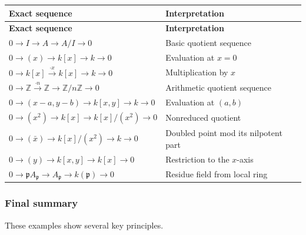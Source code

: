 \documentclass[12pt,a4paper]{article}
\theoremstyle{notespace}
\newcommand{\mf}{\mathfrak}
\theoremstyle{definition}
\begin{document}
\begin{center}
	\renewcommand{\arraystretch}{1.35}
	\begin{longtable}{>{\raggedright\arraybackslash}p{}
			>{\raggedright\arraybackslash}p{}}
		\toprule
		\textbf{Exact sequence} & \textbf{Interpretation} \\
		\midrule
		\endfirsthead
		
		\toprule
		\textbf{Exact sequence} & \textbf{Interpretation} \\
		\midrule
		\endhead
		
		\bottomrule
		\endfoot
		
		\(
		0\to I\to A\to A/I\to 0
		\)
		&
		Basic quotient sequence
		\\
		
		\(
		0\to (x)\to k[x]\to k\to 0
		\)
		&
		Evaluation at \(x=0\)
		\\
		
		\(
		0\to k[x]\xrightarrow{\cdot x}k[x]\to k\to 0
		\)
		&
		Multiplication by \(x\)
		\\
		
		\(
		0\to \mathbb Z\xrightarrow{\cdot n}\mathbb Z\to \mathbb Z/n\mathbb Z\to 0
		\)
		&
		Arithmetic quotient sequence
		\\
		
		\(
		0\to (x-a,y-b)\to k[x,y]\to k\to 0
		\)
		&
		Evaluation at \((a,b)\)
		\\
		
		\(
		0\to (x^2)\to k[x]\to k[x]/(x^2)\to 0
		\)
		&
		Nonreduced quotient
		\\
		
		\(
		0\to (\bar x)\to k[x]/(x^2)\to k\to 0
		\)
		&
		Doubled point mod its nilpotent part
		\\
		
		\(
		0\to (y)\to k[x,y]\to k[x]\to 0
		\)
		&
		Restriction to the \(x\)-axis
		\\
		
		\(
		0\to \mf p A_{\mf p}\to A_{\mf p}\to k(\mf p)\to 0
		\)
		&
		Residue field from local ring
		\\
	\end{longtable}
\end{center}

\subsubsection{Final summary}

These examples show several key principles.
\end{document}
